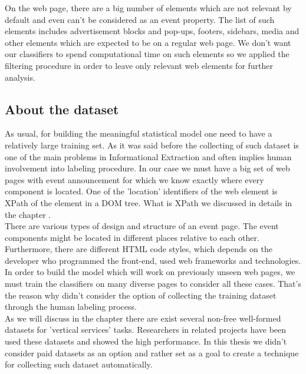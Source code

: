 On the web page, there are a big number of elements which are not relevant by default and even can't be considered as an event property. The list of such elements includes advertisement blocks and pop-ups, footers, sidebars, media and other elements which are expected to be on a regular web page. We don't want our classifiers to spend computational time on such elements so we applied the filtering procedure in order to leave only relevant web elements for further analysis.\\

\subsection*{About the dataset}
As usual, for building the meaningful statistical model one need to have a relatively large training set. As it was said before the collecting of such dataset is one of the main problems in Informational Extraction and often implies human involvement into labeling procedure. In our case we must have a big set of web pages with event announcement for which we know exactly where every component is located. One of the 'location' identifiers of the web element is XPath of the element in a DOM tree. What is XPath we discussed in details in the chapter .\\

There are various types of design and structure of an event page. The event components might be located in different places relative to each other. Furthermore, there are different HTML code styles, which depends on the developer who programmed the front-end, used web frameworks and technologies. In order to build the model which will work on previously unseen web pages, we must train the classifiers on many diverse pages to consider all these cases. That's the reason why didn't consider the option of collecting the training dataset through the human labeling process.\\   

As we will discuss in the chapter  there are exist several non-free well-formed datasets for 'vertical services' tasks. Researchers in related projects have been used these datasets and showed the high performance. In this thesis we didn't consider paid datasets as an option and rather set as a goal to create a technique for collecting such dataset automatically.\\

